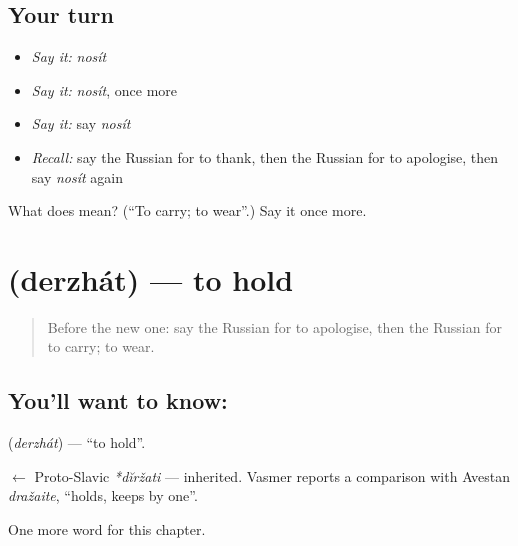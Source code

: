\subsection*{Your turn}
\begin{itemize}
\raggedright
  \item \emph{Say it:} \emph{nosít}
  \item \emph{Say it:} \emph{nosít}, once more
  \item \emph{Say it:} say \emph{nosít}
  \item \emph{Recall:} say the Russian for to thank, then the Russian for to apologise, then say \emph{nosít} again
\end{itemize}

\begin{tcolorbox}[breakable,colback=teal!4,colframe=teal!35!black,title={Before you move on}]
What does  mean? (\textquotedblleft{}To carry; to wear\textquotedblright{}.) Say it once more.
\end{tcolorbox}
\section[\texorpdfstring{\ru{держать} (derzhát)}{держать (derzhát)}]{ (derzhát) — to hold}

\label{lesson:RU-C142-derzhat}



\begin{quote}
Before the new one: say the Russian for to apologise, then the Russian for to carry; to wear.
\end{quote}

\subsection*{You'll want to know: }
\textbf{} (\emph{derzhát}) — \textquotedblleft{}to hold\textquotedblright{}.

\begin{cousinweb}
\textbf{} $\leftarrow$ Proto-Slavic \emph{*dĭržati} — inherited. Vasmer reports a comparison with Avestan \emph{dražaite}, \textquotedblleft{}holds, keeps by one\textquotedblright{}.
\end{cousinweb}

\begin{grammarlens}[title={What you've built}]
One more word for this chapter.
\end{grammarlens}

